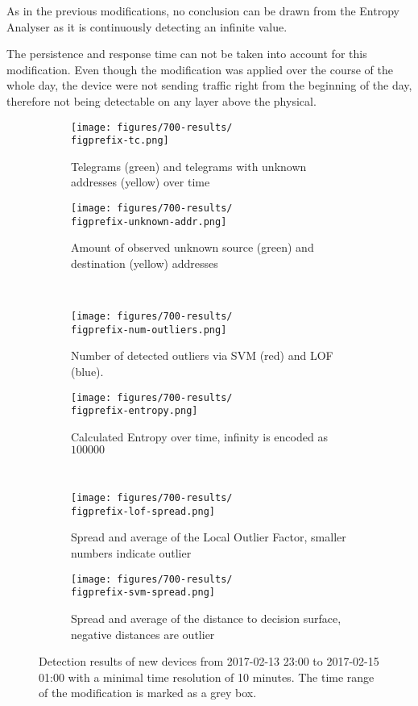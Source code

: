 As in the previous modifications, no conclusion can be drawn from the Entropy Analyser as it is continuously detecting an infinite value.

The persistence and response time can not be taken into account for this modification. Even though the modification was applied over the course of the whole day, the device were not sending traffic right from the beginning of the day, therefore not being detectable on any layer above the physical.

\begin{figure}[H]
	\newcommand{\figwith}{0.49\textwidth}
	\newcommand{\figprefix}{newdevice}
	\centering
	
	\begin{subfigure}[b]{\figwith}
		\texttt{[image: figures/700-results/\\figprefix-tc.png]}
		\caption{Telegrams (green) and telegrams with unknown addresses (yellow) over time}
		\label{fig:results:\figprefix:tc}
	\end{subfigure}
	\hfil
	\begin{subfigure}[b]{\figwith}
		\texttt{[image: figures/700-results/\\figprefix-unknown-addr.png]}
		\caption{Amount of observed unknown source (green) and destination (yellow) addresses}
		\label{fig:results:\figprefix:addr}
	\end{subfigure}
	\\[1.5mm]
	\begin{subfigure}[b]{\figwith}
		\texttt{[image: figures/700-results/\\figprefix-num-outliers.png]}
		\caption{Number of detected outliers via SVM (red) and LOF (blue).}
		\label{fig:results:\figprefix:outlier}
	\end{subfigure}
	\hfil
	\begin{subfigure}[b]{\figwith}
		\texttt{[image: figures/700-results/\\figprefix-entropy.png]}
		\caption{Calculated Entropy over time, infinity is encoded as $100 000$}
		\label{fig:results:\figprefix:entropy}
	\end{subfigure}
	\\[1.5mm]
	\begin{subfigure}[b]{\figwith}
		\texttt{[image: figures/700-results/\\figprefix-lof-spread.png]}
		\caption{Spread and average of the Local Outlier Factor, smaller numbers indicate outlier}
		\label{fig:results:\figprefix:lof}
	\end{subfigure}
	\hfil
	\begin{subfigure}[b]{\figwith}
		\texttt{[image: figures/700-results/\\figprefix-svm-spread.png]}
		\caption{Spread and average of the distance to decision surface, negative distances are outlier}
		\label{fig:results:\figprefix:svm}
	\end{subfigure}
	
	\caption[Detection results of new devices]{Detection results of new devices from 2017-02-13 23:00 to 2017-02-15 01:00 with a minimal time resolution of 10 minutes. The time range of the modification is marked as a grey box.}
	\label{fig:results:\figprefix}
	
\end{figure}

